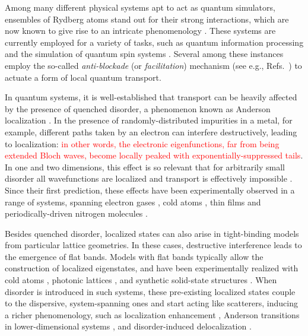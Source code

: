 \documentclass[prl,aps,twocolumn,showpacs,superscriptaddress,longbibliography]{revtex4-1}
\newcommand{\changer}[1]{\textcolor{red}{#1}}
\begin{document}
Among many different physical systems apt to act as quantum simulators, ensembles of Rydberg atoms \cite{a_Saffman_RMP_10, Low_2012, Gallagher_1994} stand out for their strong interactions, which are now known to give rise to an intricate phenomenology \cite{Weimer2010, Lan2016, Levi2016, Lan2015, Schempp2014, Schauss_2015, Low2009, Sibalic2016, Carr2013, Marcuzzi2014, Gutierrez2015}. These systems are currently employed for a variety of tasks, such as quantum information processing \cite{Jaksch2000,Weimer_2010,Saffman_2016} and the simulation of quantum spin systems \cite{Labuhn_2015, Schauss_2015}. Several among these instances employ the so-called \emph{anti-blockade} (or \emph{facilitation}) mechanism (see e.g., Refs.~\cite{Ates_2007,Amthor_2010,Garttner_2013,schonleber2014,Lesanovsky_2014,Urvoy_2015,Valado_2016}) to actuate a form of local quantum transport.



In quantum systems, it is well-established that transport can be heavily affected by the presence of quenched disorder, a phenomenon known as Anderson localization \cite{Anderson1958}. In the presence of randomly-distributed impurities in a metal, for example, different paths taken by an electron can interfere destructively, leading to localization: \changer{in other words, the electronic eigenfunctions, far from being extended Bloch waves, become locally peaked with exponentially-suppressed tails}. In one and two dimensions, this effect is so relevant that for arbitrarily small disorder all wavefunctions are localized and transport is effectively impossible \cite{Mott1961,Ishii1973}. Since their first prediction, these effects have been experimentally observed in a range of systems, spanning electron gases \cite{Cutler:1969}, cold atoms \cite{Billy:2008,Roati:2008,Semeghini:2015}, thin films \cite{Liao:2015} and periodically-driven nitrogen molecules \cite{Bitter:2016}. 


Besides quenched disorder, localized states can also arise in tight-binding models from particular lattice geometries. In these cases, destructive interference leads to the emergence of flat bands. Models with flat bands typically allow the construction of localized eigenstates, and have been experimentally realized with cold atoms \cite{Shen2010}, photonic lattices \cite{Mukherjee2015}, and synthetic solid-state structures \cite{slot2017, drost2017}. When disorder is introduced in such systems, these pre-existing localized states couple to the dispersive, system-spanning ones and start acting like scatterers, inducing a richer phenomenology, such as localization enhancement \cite{Leykam2017}, Anderson transitions in lower-dimensional systems \cite{Bodyfelt2014}, and disorder-induced delocalization \cite{Goda2006}.
\end{document}
